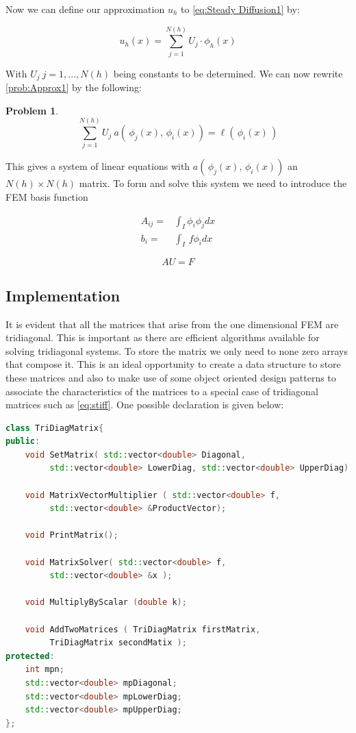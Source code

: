 \documentclass{uonmathreport}
\theoremstyle{definition}
\theoremstyle{problem}
\newtheorem{problem}{Problem}[section]
\theoremstyle{theorem}
\begin{document}
Now we can define our approximation $u_h$ to \ref{eq:Steady Diffusion1} by:

\begin{equation*}
u_h(x) = \sum_{j=1}^{N(h)} U_j \cdot \phi_h(x)
\end{equation*}

With $U_j \: j = 1, ..., N(h)$ being constants to be determined. We can now rewrite \ref{prob:Approx1} by the following:

\begin{problem}
$$\sum_{j=1}^{N(h)}U_j \: a( \,\phi_j(x),\, \phi_i(x)) = \ell(\,\phi_i(x)\,) $$
\end{problem}

This gives a system of linear equations with $a( \,\phi_j(x),\, \phi_i(x))$ an $N(h)\times N(h)$ matrix. To form and solve this system we need to introduce the FEM basis function 

\begin{subequations} 
\begin{align}
A_{ij} =& \int_I \phi_i \phi_j dx \label{eq:stiff}\\
b_i =& \int_I  \, f\phi_i dx
\end{align}
\end{subequations}

\begin{equation}
AU = F			\label{system1}
\end{equation}

\subsection{Implementation} \label{subsec:Implementation1}

It is evident that all the matrices that arise from the one dimensional FEM are tridiagonal. This is important as there are efficient algorithms available for solving tridiagonal systems. To store the matrix we only need to  none zero arrays that compose it. This is an ideal opportunity to create a data structure to store these matrices and also to make use of some object oriented design patterns to associate the characteristics of the matrices to a special case of tridiagonal matrices such as \ref{eq:stiff}. One possible declaration is given below:

\begin{lstlisting}[language=C++]
class TriDiagMatrix{
public:
    void SetMatrix( std::vector<double> Diagonal,
         std::vector<double> LowerDiag, std::vector<double> UpperDiag);

    void MatrixVectorMultiplier ( std::vector<double> f, 
    	 std::vector<double> &ProductVector);

    void PrintMatrix();

    void MatrixSolver( std::vector<double> f,
         std::vector<double> &x );

    void MultiplyByScalar (double k);

    void AddTwoMatrices ( TriDiagMatrix firstMatrix, 
    	 TriDiagMatrix secondMatix );
protected:
    int mpn;
    std::vector<double> mpDiagonal;
    std::vector<double> mpLowerDiag;
    std::vector<double> mpUpperDiag;
};
\end{lstlisting}
\end{document}
